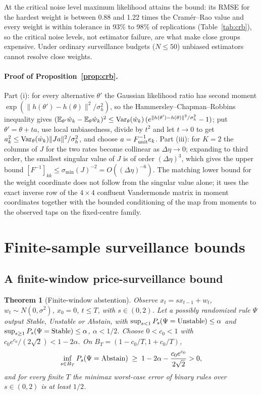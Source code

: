 \documentclass[12pt]{article}
\newtheorem{theorem}{Theorem}[section]
\theoremstyle{definition}
\theoremstyle{remark}
\newcommand{\E}{\mathbb{E}}
\begin{document}
At the critical noise level maximum likelihood attains the bound: its RMSE for the hardest weight is between 0.88 and 1.22 times the Cram\'er--Rao value and every weight is within tolerance in 93\% to 98\% of replications (Table~\ref{tab:crb}), so the critical noise levels, not estimator failure, are what make close groups expensive. Under ordinary surveillance budgets ($N\le50$) unbiased estimators cannot resolve close weights.

\paragraph{Proof of Proposition~\ref{prop:crb}.}
 Part (i): for every alternative $\theta'$ the Gaussian likelihood ratio has second moment $\exp(\|h(\theta')-h(\theta)\|^2/\sigma_h^2)$, so the Hammersley--Chapman--Robbins inequality gives $(\E_{\theta'}\hat w_k-\E_\theta\hat w_k)^2\le{\rm Var}_\theta(\hat w_k)\,(e^{\|h(\theta')-h(\theta)\|^2/\sigma_h^2}-1)$; put $\theta'=\theta+ta$, use local unbiasedness, divide by $t^2$ and let $t\to0$ to get $a_k^2\le{\rm Var}_\theta(\hat w_k)\|Ja\|^2/\sigma_h^2$, and choose $a=F_{\rm unit}^{-1}e_k$. Part (iii): for $K=2$ the columns of $J$ for the two rates become collinear as $\Delta\eta\to0$; expanding to third order, the smallest singular value of $J$ is of order $(\Delta\eta)^3$, which gives the upper bound $[F^{-1}]_{kk}\le\sigma_{\min}(J)^{-2}=O((\Delta\eta)^{-6})$. The matching lower bound for the weight coordinate does not follow from the singular value alone; it uses the exact inverse row of the $4\times4$ confluent Vandermonde matrix in moment coordinates together with the bounded conditioning of the map from moments to the observed taps on the fixed-centre family.


\section{Finite-sample surveillance bounds}\label{app:restored_finite}

\subsection{A finite-window price-surveillance bound}

\begin{theorem}[Finite-window abstention]\label{thm:abstain}
Observe $x_t=sx_{t-1}+w_t$, $w_t\sim N(0,\sigma^2)$, $x_0=0$, $t\le T$, with $s\in(0,2)$. Let a possibly randomized rule $\Psi$ output Stable, Unstable or Abstain, with $\sup_{s<1}P_s(\Psi={\rm Unstable})\le\alpha$ and $\sup_{s\ge1}P_s(\Psi={\rm Stable})\le\alpha$, $\alpha<1/2$. Choose $0<c_0<1$ with $c_0e^{c_0}/(2\sqrt2)<1-2\alpha$. On $B_T=(1-c_0/T,1+c_0/T)$,
\[
\inf_{s\in B_T}P_s(\Psi={\rm Abstain})\;\ge\;1-2\alpha-\frac{c_0e^{c_0}}{2\sqrt2}>0 ,
\]
and for every finite $T$ the minimax worst-case error of binary rules over $s\in(0,2)$ is at least $1/2$.
\end{theorem}
\end{document}
